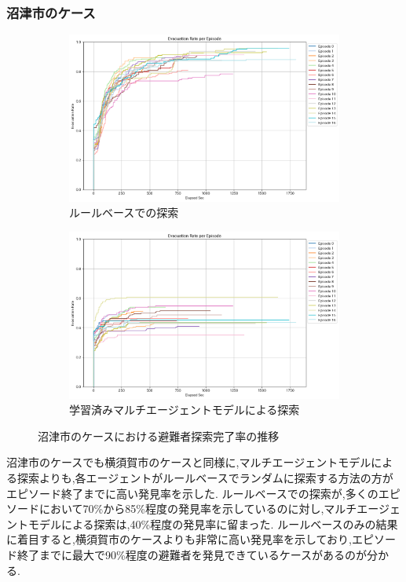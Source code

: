 \subsubsection{沼津市のケース}
\begin{figure}[H]
  \centering
  \begin{subfigure}{0.45\textwidth}
      \centering
      \includegraphics[width=\textwidth]{Figures/NumazuSearch-RuleResult.png}
      \caption{ルールベースでの探索}
      \label{fig:NumazuSearch-RuleResult}
  \end{subfigure}
  \begin{subfigure}{0.45\textwidth}
      \centering
      \includegraphics[width=\textwidth]{Figures/NumazuSearch-AgentsResult.png}
      \caption{学習済みマルチエージェントモデルによる探索}
      \label{fig:NumazuModel-Result2}
  \end{subfigure}
  \caption{沼津市のケースにおける避難者探索完了率の推移}
  \label{fig:Model-Result-Errors}
\end{figure}
沼津市のケースでも横須賀市のケースと同様に,マルチエージェントモデルによる探索よりも,各エージェントがルールベースでランダムに探索する方法の方がエピソード終了までに高い発見率を示した.
ルールベースでの探索が,多くのエピソードにおいて70\%から85\%程度の発見率を示しているのに対し,マルチエージェントモデルによる探索は,40\%程度の発見率に留まった.
ルールベースのみの結果に着目すると,横須賀市のケースよりも非常に高い発見率を示しており,エピソード終了までに最大で90\%程度の避難者を発見できているケースがあるのが分かる.

